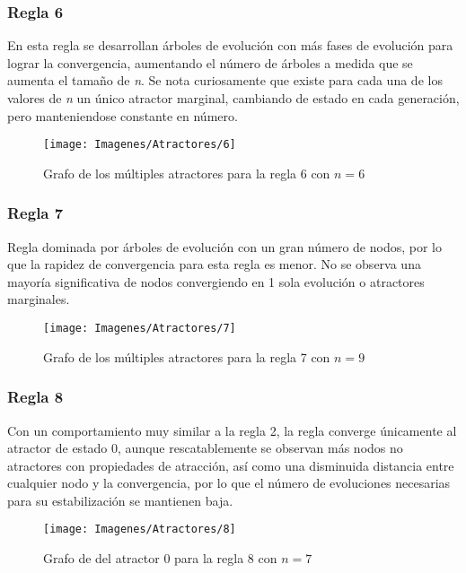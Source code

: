 \documentclass[]{article}
\begin{document}
			
			\newpage
			\subsubsection{Regla 6}
				\justifying
				En esta regla se desarrollan árboles de evolución con más fases de evolución para lograr la convergencia, aumentando el número de árboles a medida que se aumenta el tamaño de \textit{n}. Se nota curiosamente que existe para cada una de los valores de \textit{n} un único atractor marginal, cambiando de estado en cada generación, pero manteniendose constante en número.
				
				\hfill\break
				\hfill\break
				\hfill\break
				\hfill\break
				\hfill\break
				\begin{figure}[!h]
					\centering
					\texttt{[image: Imagenes/Atractores/6]}
					\caption{Grafo de los múltiples atractores para la regla 6 con $n=6$}
					\label{Regla_6}
				\end{figure}
				
				
			\newpage
			\subsubsection{Regla 7}
				\justifying
				Regla dominada por árboles de evolución con un gran número de nodos, por lo que la rapidez de convergencia para esta regla es menor. No se observa una mayoría significativa de nodos convergiendo en 1 sola evolución o atractores marginales.
				
				
				\hfill\break
				\begin{figure}[!h]
					\centering
					\texttt{[image: Imagenes/Atractores/7]}
					\caption{Grafo de los múltiples atractores para la regla 7 con $n=9$}
					\label{Regla_7}
				\end{figure}
			
			
			\newpage
			\subsubsection{Regla 8}
				\justifying
				Con un comportamiento muy similar a la regla 2, la regla converge únicamente al atractor de estado 0, aunque rescatablemente se observan más nodos no atractores con propiedades de atracción, así como una disminuida distancia entre cualquier nodo y la convergencia, por lo que el número de evoluciones necesarias para su estabilización se mantienen baja.
				
				
				\hfill\break
				\hfill\break
				\hfill\break
				\hfill\break
				\begin{figure}[!h]
					\centering
					\texttt{[image: Imagenes/Atractores/8]}
					\caption{Grafo de del atractor 0 para la regla 8 con $n=7$}
					\label{Regla_8}
				\end{figure}
				
\end{document}
